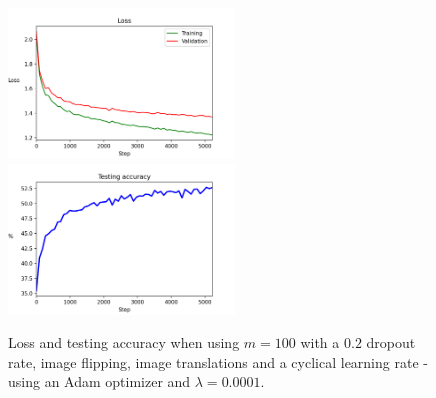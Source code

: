\documentclass{article}
\begin{document}
	\begin{figure}[!h]
	\centering
	\includegraphics[width=6cm]{../plots/adam/loss_v0.png}
	\includegraphics[width=6cm]{../plots/adam/acc_v0.png}
	\caption{Loss and testing accuracy when using $m=100$ with a $0.2$ dropout rate, image flipping, image translations and a cyclical learning rate - using an Adam optimizer and $\lambda = 0.0001$.}
	\end{figure}

\newpage
\end{document}

